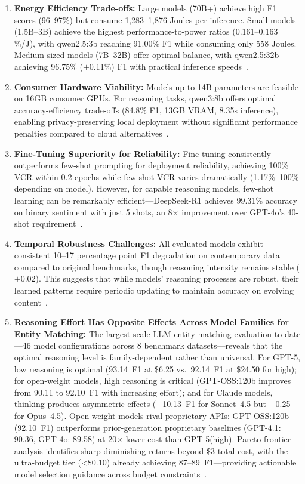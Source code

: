 \begin{enumerate}[leftmargin=*]
    \item \textbf{Energy Efficiency Trade-offs:} Large models (70B+) achieve high F1 scores (96--97\%) but consume 1,283--1,876 Joules per inference. Small models (1.5B--3B) achieve the highest performance-to-power ratios (0.161--0.163 \%/J), with qwen2.5:3b reaching 91.00\% F1 while consuming only 558 Joules. Medium-sized models (7B--32B) offer optimal balance, with qwen2.5:32b achieving 96.75\% ($\pm$0.11\%) F1 with practical inference speeds~\cite{huang2025edge}.
    
    \item \textbf{Consumer Hardware Viability:} Models up to 14B parameters are feasible on 16GB consumer GPUs. For reasoning tasks, qwen3:8b offers optimal accuracy-efficiency trade-offs (84.8\% F1, 13GB VRAM, 8.35s inference), enabling privacy-preserving local deployment without significant performance penalties compared to cloud alternatives~\cite{huang2025reasoning_deployment}.
    
    \item \textbf{Fine-Tuning Superiority for Reliability:} Fine-tuning consistently outperforms few-shot prompting for deployment reliability, achieving 100\% VCR within 0.2 epochs while few-shot VCR varies dramatically (1.17\%--100\% depending on model). However, for capable reasoning models, few-shot learning can be remarkably efficient---DeepSeek-R1 achieves 99.31\% accuracy on binary sentiment with just 5 shots, an 8$\times$ improvement over GPT-4o's 40-shot requirement~\cite{huang2025logical,huang2025deepseek}.
    
    \item \textbf{Temporal Robustness Challenges:} All evaluated models exhibit consistent 10--17 percentage point F1 degradation on contemporary data compared to original benchmarks, though reasoning intensity remains stable ($\pm$0.02). This suggests that while models' reasoning processes are robust, their learned patterns require periodic updating to maintain accuracy on evolving content~\cite{huang2025reasoning_deployment}.
    
    \item \textbf{Reasoning Effort Has Opposite Effects Across Model Families for Entity Matching:} The largest-scale LLM entity matching evaluation to date---46 model configurations across 8 benchmark datasets---reveals that the optimal reasoning level is family-dependent rather than universal.  For GPT-5, low reasoning is optimal (93.14~F1 at \$6.25 vs.\ 92.14~F1 at \$24.50 for high); for open-weight models, high reasoning is critical (GPT-OSS:120b improves from 90.11 to 92.10~F1 with increasing effort); and for Claude models, thinking produces asymmetric effects (+10.13~F1 for Sonnet~4.5 but $-$0.25 for Opus~4.5).  Open-weight models rival proprietary APIs: GPT-OSS:120b (92.10~F1) outperforms prior-generation proprietary baselines (GPT-4.1: 90.36, GPT-4o: 89.58) at 20$\times$ lower cost than GPT-5(high).  Pareto frontier analysis identifies sharp diminishing returns beyond \$3 total cost, with the ultra-budget tier (\textless\$0.10) already achieving 87--89~F1---providing actionable model selection guidance across budget constraints~\cite{huang2026entity}.


\end{enumerate}
